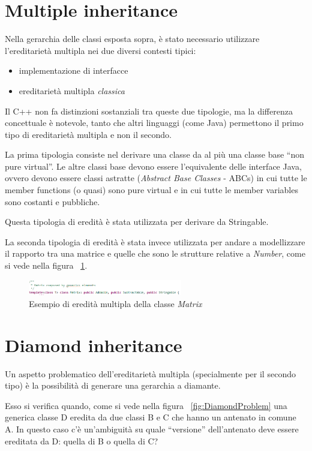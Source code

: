 \section{Multiple inheritance}
Nella gerarchia delle classi esposta sopra, è stato necessario utilizzare l’ereditarietà multipla
nei due diversi contesti tipici: 
\begin{itemize}
	\item implementazione di interfacce
	\item ereditarietà multipla \textit{classica}
\end{itemize}

Il C++ non fa distinzioni sostanziali tra queste due tipologie, ma la differenza concettuale è
notevole, tanto che altri linguaggi (come Java) permettono il primo tipo di ereditarietà multipla
e non il secondo.

La prima tipologia consiste nel derivare una classe da al più una classe base “non pure virtual”.
Le altre classi base devono essere l’equivalente delle interface Java, ovvero devono essere
classi astratte (\textit{Abstract Base Classes} - ABCs) in cui tutte le member functions (o quasi) sono
pure virtual e in cui tutte le member variables sono costanti e pubbliche.

Questa tipologia di eredità è stata utilizzata per derivare da Stringable.

La seconda tipologia di eredità è stata invece utilizzata per andare a modellizzare il rapporto tra una matrice e quelle che sono le strutture relative a \textit{Number}, come si vede nella figura ~\ref{fig:MultipleInerithance}.

\begin{figure}[h]
	\centering
	\includegraphics[width=0.6\textwidth]{Immagini/MultipleInerithance.png}
	\caption{Esempio di eredità multipla della classe \textit{Matrix}}
	\label{fig:MultipleInerithance}
\end{figure}

\section{Diamond inheritance}
Un aspetto problematico dell’ereditarietà multipla (specialmente per il secondo tipo) è la
possibilità di generare una gerarchia a diamante.

Esso si verifica quando, come si vede nella figura ~\ref{fig:DiamondProblem} una generica classe D eredita da due classi B e C che hanno un antenato in
comune A. In questo caso c'è un'ambiguità su quale “versione” dell'antenato deve essere ereditata
da D: quella di B o quella di C?

